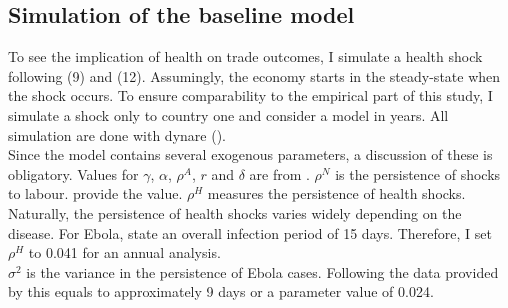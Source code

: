 \documentclass{article}
\begin{document}
\subsection{Simulation of the baseline model}
To see the implication of health on trade outcomes, I simulate a health shock following (9) and (12). Assumingly, the economy starts in the steady-state when the shock occurs. To ensure comparability to the empirical part of this study, I simulate a shock only to country one and consider a model in years. All simulation are done with dynare (\cite{adjemian2011dynare}).\\
Since the model contains several exogenous parameters, a discussion of these is obligatory. Values for $\gamma$, $\alpha$, $\rho^{A}$, $r$ and $\delta$ are from \cite{schmitt2003closing}. $\rho^N$ is the persistence of shocks to labour. \cite{smets2007shocks} provide the value. $\rho^H$ measures the persistence of health shocks. Naturally, the persistence of health shocks varies widely depending on the disease. For Ebola, \cite{fisman2014early} state an overall infection period of 15 days. Therefore, I set $\rho^H$ to 0.041 for an annual analysis.\\
$\sigma^{2}$ is the variance in the persistence of Ebola cases. Following the data provided by \cite{fisman2014early} this equals to approximately 9 days or a parameter value of 0.024.
\end{document}
